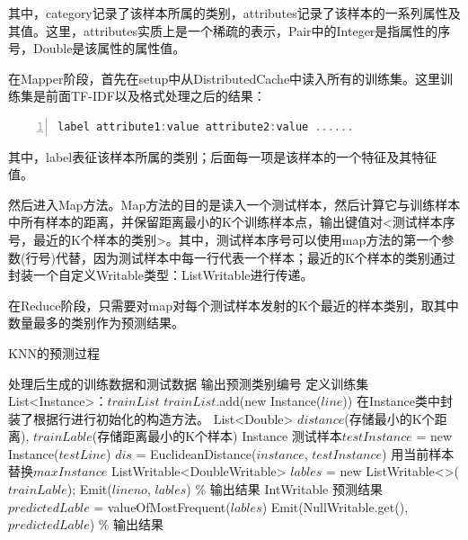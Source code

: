 \documentclass[lang=cn,11pt]{elegantpaper}
\begin{document}
其中，category记录了该样本所属的类别，attributes记录了该样本的一系列属性及其值。这里，attributes实质上是一个稀疏的表示，Pair中的Integer是指属性的序号，Double是该属性的属性值。\par
在Mapper阶段，首先在setup中从DistributedCache中读入所有的训练集。这里训练集是前面TF-IDF以及格式处理之后的结果：\par
\begin{lstlisting}[language={Scala},numbers=left,numberstyle=\tiny,%frame=shadowbox,  
  rulesepcolor=\color{red!20!green!20!blue!20},  
  keywordstyle=\color{blue!70!black},  
  commentstyle=\color{blue!90!},  
  basicstyle=\ttfamily]  
  label attribute1:value attribute2:value ......
\end{lstlisting}\par
其中，label表征该样本所属的类别；后面每一项是该样本的一个特征及其特征值。\par
然后进入Map方法。Map方法的目的是读入一个测试样本，然后计算它与训练样本中所有样本的距离，并保留距离最小的K个训练样本点，输出键值对<测试样本序号，最近的K个样本的类别>。其中，测试样本序号可以使用map方法的第一个参数(行号)代替，因为测试样本中每一行代表一个样本；最近的K个样本的类别通过封装一个自定义Writable类型：ListWritable进行传递。\par
在Reduce阶段，只需要对map对每个测试样本发射的K个最近的样本类别，取其中数量最多的类别作为预测结果。
\begin{algorithm}[!htb]
  \caption{KNN的预测过程}
  \label{alg:Framwork}
  \begin{algorithmic}[1]
    \Require
    处理后生成的训练数据和测试数据
    \Ensure
    输出预测类别编号
    \State 定义训练集List<Instance>：$trainList$
      \State $trainList$.add(new Instance($line$))
      \Comment 在Instance类中封装了根据行进行初始化的构造方法。
    \EndFor
  \EndFunction
    \State List<Double> $distance$(存储最小的K个距离), $trainLable$(存储距离最小的K个样本)
    \State Instance 测试样本$testInstance$ = new Instance($testLine$)
        \State $dis$ = EuclideanDistance($instance$, $testInstance$)
          \State 用当前样本替换$maxInstance$
        \EndIf
    \EndFor
    \State ListWritable<DoubleWritable> $lables$ = new ListWritable<>($trainLable$);
    \State Emit($lineno$, $lables$) \% 输出结果
  \EndFunction
  	\State IntWritable 预测结果$predictedLable$ = valueOfMostFrequent($lables$)
    \State Emit(NullWritable.get(), $predictedLable$) \% 输出结果
  \EndFunction
  \end{algorithmic}
\end{algorithm}
\end{document}
